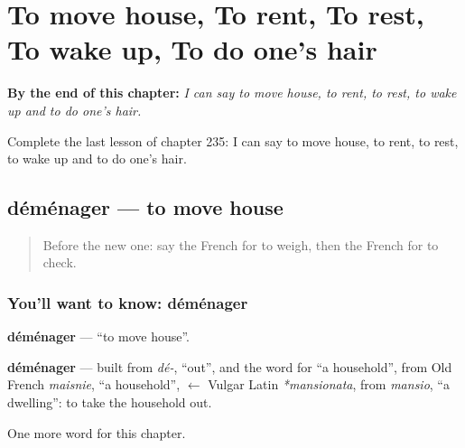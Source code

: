 
\chapter{To move house, To rent, To rest, To wake up, To do one's hair}
\label{ch:fr-to-move-house-to-rent-to-rest-to-wake-up-to-do-one-s-hair}

\begin{chapteropening}
\textbf{By the end of this chapter:} \emph{I can say to move house, to rent, to rest, to wake up and to do one's hair.}

Complete the last lesson of chapter 235: I can say to move house, to rent, to rest, to wake up and to do one's hair.
\end{chapteropening}

\section[déménager]{déménager — to move house}

\label{lesson:FR-C235-demenager}



\begin{quote}
Before the new one: say the French for to weigh, then the French for to check.
\end{quote}

\subsection*{You'll want to know: déménager}
\textbf{déménager} — \textquotedblleft{}to move house\textquotedblright{}.

\begin{cousinweb}
\textbf{déménager} — built from \emph{dé-}, \textquotedblleft{}out\textquotedblright{}, and the word for \textquotedblleft{}a household\textquotedblright{}, from Old French \emph{maisnie}, \textquotedblleft{}a household\textquotedblright{}, $\leftarrow$ Vulgar Latin \emph{*mansionata}, from \emph{mansio}, \textquotedblleft{}a dwelling\textquotedblright{}: to take the household out.
\end{cousinweb}

\begin{grammarlens}[title={What you've built}]
One more word for this chapter.
\end{grammarlens}

